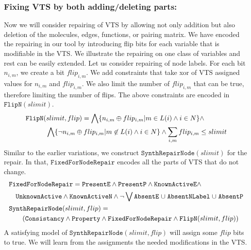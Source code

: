\subsubsection{Fixing VTS by both adding/deleting parts:}
%
Now we will consider repairing of VTS by allowing not only addition but also
deletion of the molecules, edges, functions, or pairing matrix.
%
We have encoded the repairing in our tool by introducing flip bits
for each variable that is modifiable in the VTS.
%
We illustrate the repairing on one class of variables and rest can be
easily extended.
%
Let us consider repairing of node labels.
%
For each bit $n_{i,m}$, we create a bit $flip_{i,m}$.
%
We add constraints that take xor of VTS assigned values for  $n_{i,m}$
and $flip_{i,m}$.
%
We also limit the number of $flip_{i,m}$ that can be true, therefore
limiting the number of flips.
%
The above constraints are encoded in $\texttt{FlipN}(slimit)$.
\begin{align*}
&\texttt{FlipN}(slimit,flip) = \bigwedge \{n_{i,m}\oplus flip_{i,m}| m \in L(i) \land i \in N \} \land \\
& \quad \quad \quad
\bigwedge \{ \lnot n_{i,m}\oplus flip_{i,m}| m \not \in L(i) \land i \in N \} \land  \sum\limits_{i,m} flip_{i,m} \leq slimit
\end{align*}
%
Similar to the earlier variations, we construct
$\texttt{SynthRepairNode}(slimit)$ for the repair.
%
In that, $\texttt{FixedForNodeRepair}$ encodes all the parts of VTS that do not change.
\begin{align*}
& \texttt{FixedForNodeRepair} =  \texttt{PresentE} \land  
\texttt{PresentP} \land \texttt{KnownActiveE} 
\land \\
& \quad \texttt{UnknownActive} \land \texttt{KnownActiveN} \land \lnot 
\bigvee \texttt{AbsentE} \;{\cup}\; \texttt{AbsentNLabel} \;{\cup}\;
\texttt{AbsentP}\\
&\texttt{SynthRepairNode}(slimit,flip) = \\
& \quad\quad
(  \texttt{Consistancy}\land \texttt{Property} \land
\texttt{FixedForNodeRepair} \land \texttt{FlipN}(slimit,flip) )
\end{align*}
A satisfying model of $\texttt{SynthRepairNode}(slimit,flip)$ will assign some
$flip$ bits to true.
We will learn from the assignments the needed modifications in the VTS. 

               
